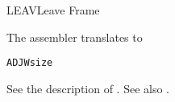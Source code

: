 \begin{instruction}{LEAV}{Leave Frame}
  \begin{remarks}
The assembler translates \texttt{\mnemonic} to
\begin{alltt}
  ADJW size
\end{alltt}

See the description of . See also .
  \end{remarks}
\end{instruction}
